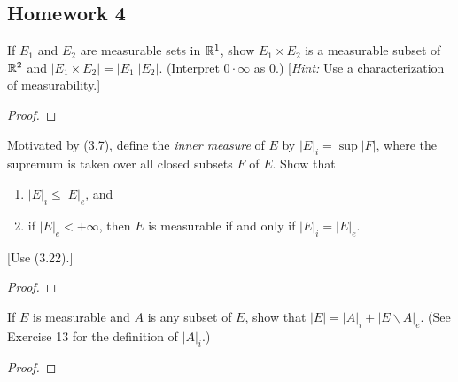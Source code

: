 \subsection{Homework 4}

\begin{problem}
If $E_1$ and $E_2$ are measurable sets in $\mathbb{R}^1$, show $E_1\times E_2$ is
a measurable subset of $\mathbb{R}^2$ and $|E_1\times E_2|=|E_1||E_2|$. (Interpret
$0\cdot\infty$ as $0$.) [\emph{Hint:} Use a characterization of
measurability.]
\end{problem}
\begin{proof}
\end{proof}

\begin{problem}
Motivated by (3.7), define the \emph{inner measure} of $E$ by
$|E|_i=\sup|F|$, where the supremum is taken over all closed subsets $F$ of
$E$. Show that
\begin{enumerate}[label=(\roman*)]
\item $|E|_i\leq|E|_e$, and
\item if $|E|_e<+\infty$, then $E$ is measurable if and only if
  $|E|_i=|E|_e$.
\end{enumerate}
[Use (3.22).]
\end{problem}
\begin{proof}
\end{proof}

\begin{problem}
If $E$ is measurable and $A$ is any subset of $E$, show that
$|E|=|A|_i+|E\smallsetminus A|_e$. (See Exercise 13 for
the definition of $|A|_i$.)
\end{problem}
\begin{proof}
\end{proof}

